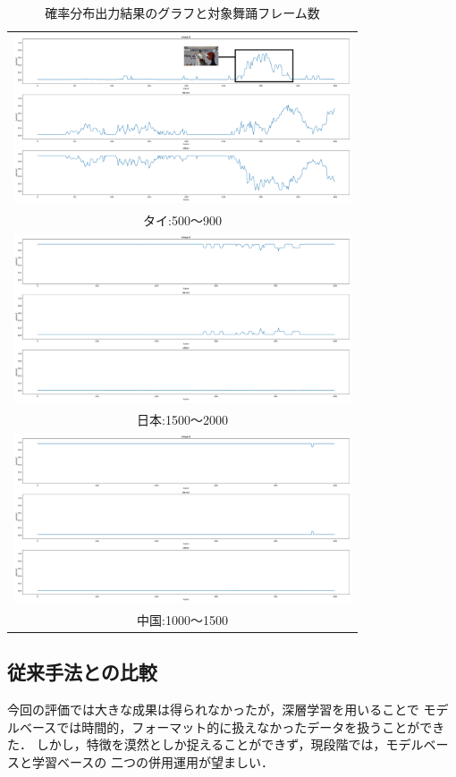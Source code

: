 \begin{table}[b]
  \begin{center}
    \begin{tabular}{c}
      \includegraphics[width=100mm]{images/dist/thai_elegant_900.pdf} \\ タイ:500〜900 \\
      \includegraphics[width=100mm]{images/dist/japanese_elegant_2000.pdf} \\ 日本:1500〜2000 \\
      \includegraphics[width=100mm]{images/dist/chinese_elegant_1500.pdf} \\ 中国:1000〜1500 \\
    \end{tabular}
  \end{center}
  \caption{確率分布出力結果のグラフと対象舞踊フレーム数}
  \label{net_dist}
\end{table}
\clearpage

\subsection{従来手法との比較}
今回の評価では大きな成果は得られなかったが，深層学習を用いることで
モデルベースでは時間的，フォーマット的に扱えなかったデータを扱うことができた．
しかし，特徴を漠然としか捉えることができず，現段階では，モデルベースと学習ベースの
二つの併用運用が望ましい．

